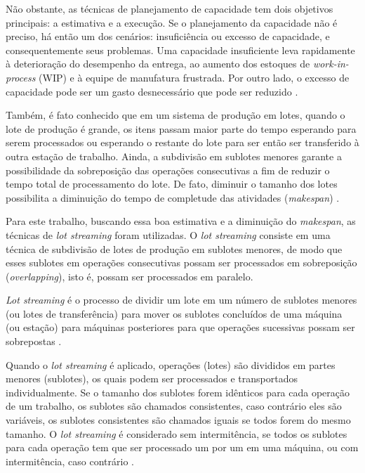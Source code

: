     Não obstante, as técnicas de planejamento de capacidade tem dois objetivos principais: a estimativa e a execução. Se o planejamento da capacidade não é preciso, há então um dos cenários: insuficiência ou excesso de capacidade, e consequentemente seus problemas. Uma capacidade insuficiente leva rapidamente à deterioração do desempenho da entrega, ao aumento dos estoques de \textit{work-in-process} (WIP) e à equipe de manufatura frustrada. Por outro lado, o excesso de capacidade pode ser um gasto desnecessário que pode ser reduzido \cite{Jacobs2011}.
    
    Também, é fato conhecido que em um sistema de produção em lotes, quando o lote de produção é grande, os itens passam maior parte do tempo esperando para serem processados ou esperando o restante do lote para ser então ser transferido à outra estação de trabalho. Ainda, a subdivisão em sublotes menores garante a possibilidade da sobreposição das operações consecutivas a fim de reduzir o tempo total de processamento do lote. De fato, diminuir o tamanho dos lotes possibilita a diminuição do tempo de completude das atividades (\textit{makespan}) \cite{Trietsch1993}. 
    
    Para este trabalho, buscando essa boa estimativa e a diminuição do \textit{makespan}, as técnicas de \textit{lot streaming} foram utilizadas. O \textit{lot streaming} consiste em uma técnica de subdivisão de lotes de produção em sublotes menores, de modo que esses sublotes em operações consecutivas possam ser processados em sobreposição (\textit{overlapping}), isto é, possam ser processados em paralelo.
    
    \textit{Lot streaming} é o processo de dividir um lote em um número de sublotes menores (ou lotes de transferência) para mover os sublotes concluídos de uma máquina (ou estação) para máquinas posteriores para que operações sucessivas possam ser sobrepostas \cite{Ventura2013}.
    
    Quando o \textit{lot streaming} é aplicado, operações (lotes) são divididos em partes menores (sublotes), os quais podem ser processados e transportados individualmente. Se o tamanho dos sublotes forem idênticos para cada operação de um trabalho, os sublotes são chamados consistentes, caso contrário eles são variáveis, os sublotes consistentes são chamados iguais se todos forem do mesmo tamanho. O \textit{lot streaming} é considerado sem intermitência, se todos os sublotes para cada operação tem que ser processado um por um em uma máquina, ou com intermitência, caso contrário \cite{Bozek2017}.
    
